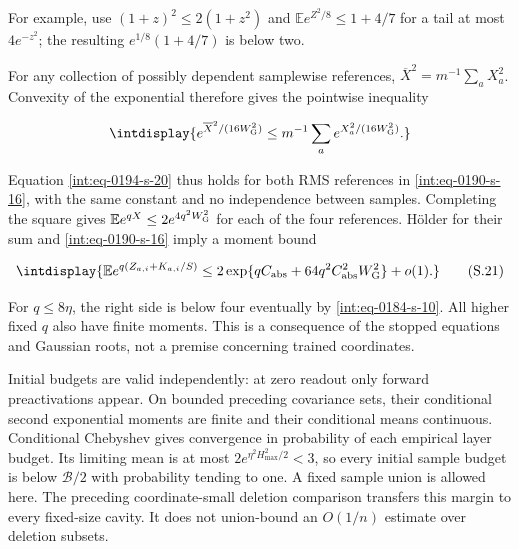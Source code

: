 
For example, use \((1+z)^2\le2(1+z^2)\) and \(\mathbb E e^{Z^2/8}\le1+4/7\) for a tail at most \(4e^{-z^2}\); the resulting \(e^{1/8}(1+4/7)\) is below two.



For any collection of possibly dependent samplewise references, \(\overline X^2=m^{-1}\sum_aX_a^2\). Convexity of the exponential therefore gives the pointwise inequality


\begingroup\renewcommand{\theHequation}{intdisplay.395}
\begin{equation*}
\intdisplay{
e^{\overline X^2/(16W_{\rm G}^2)}
\le m^{-1}\sum_a e^{X_a^2/(16W_{\rm G}^2)}.
}
\end{equation*}
\endgroup


Equation \eqref{int:eq-0194-s-20} thus holds for both RMS references in \eqref{int:eq-0190-s-16}, with the same constant and no independence between samples. Completing the square gives \(\mathbb E e^{qX}\le2e^{4q^2W_{\rm G}^2}\) for each of the four references. Hölder for their sum and \eqref{int:eq-0190-s-16} imply a moment bound


\begingroup\renewcommand{\theHequation}{intdisplay.396}
\begin{equation}
\intdisplay{
\mathbb E e^{q(Z_{a,i}+K_{a,i}/S)}
\le 2\exp\{qC_{\rm abs}+64q^2C_{\rm abs}^2W_{\rm G}^2\}+o(1).
}
\tag{S.21}
\label{int:eq-0195-s-21}
\end{equation}
\endgroup


For \(q\le8\eta\), the right side is below four eventually by \eqref{int:eq-0184-s-10}. All higher fixed \(q\) also have finite moments. This is a consequence of the stopped equations and Gaussian roots, not a premise concerning trained coordinates.



Initial budgets are valid independently: at zero readout only forward preactivations appear. On bounded preceding covariance sets, their conditional second exponential moments are finite and their conditional means continuous. Conditional Chebyshev gives convergence in probability of each empirical layer budget. Its limiting mean is at most \(2e^{\eta^2H_{\max}^2/2}<3\), so every initial sample budget is below \(\mathcal B/2\) with probability tending to one. A fixed sample union is allowed here. The preceding coordinate-small deletion comparison transfers this margin to every fixed-size cavity. It does not union-bound an \(O(1/n)\) estimate over deletion subsets.


